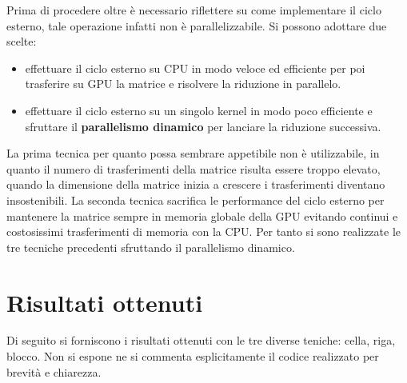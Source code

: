 \documentclass{article}
\begin{document}
Prima di procedere oltre è necessario riflettere su come implementare il ciclo esterno, tale operazione infatti non è parallelizzabile. Si possono adottare due scelte:
\begin{itemize}
\item effettuare il ciclo esterno su CPU in modo veloce ed efficiente per poi trasferire su GPU la matrice e risolvere la riduzione in parallelo.
\item effettuare il ciclo esterno su un singolo kernel in modo poco efficiente e sfruttare il \textbf{parallelismo dinamico} per lanciare la riduzione successiva.
\end{itemize}

La prima tecnica per quanto possa sembrare appetibile non è utilizzabile, in quanto il numero di trasferimenti della matrice risulta essere troppo elevato, quando la dimensione della matrice inizia a crescere i trasferimenti diventano insostenibili. La seconda tecnica sacrifica le performance del ciclo esterno per mantenere la matrice sempre in memoria globale della GPU evitando continui e costosissimi trasferimenti di memoria con la CPU. Per tanto si sono realizzate le tre tecniche precedenti sfruttando il parallelismo dinamico.

\section{Risultati ottenuti}

Di seguito si forniscono i risultati ottenuti con le tre diverse teniche: cella, riga, blocco. Non si espone ne si commenta esplicitamente il codice realizzato per brevità e chiarezza. 
\end{document}

